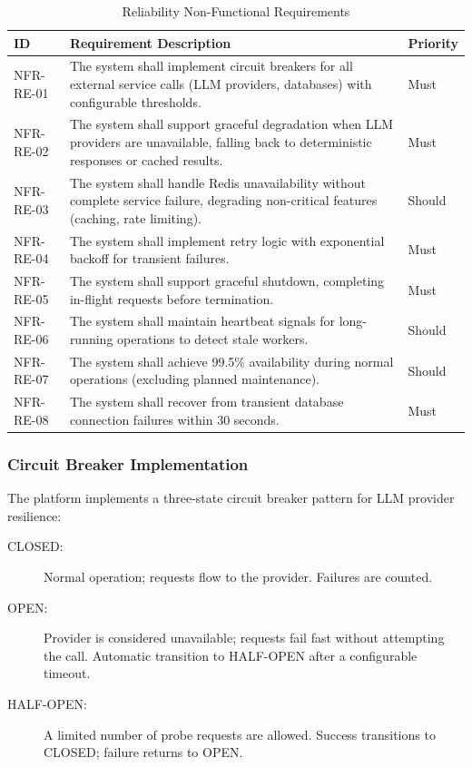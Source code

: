 \begin{table}[htbp]
\centering
\caption{Reliability Non-Functional Requirements}
\label{tab:nfr-reliability}
\small
\begin{tabularx}{\textwidth}{|l|X|l|}
\hline
\textbf{ID} & \textbf{Requirement Description} & \textbf{Priority} \\
\hline
NFR-RE-01 & The system shall implement circuit breakers for all external service calls (LLM providers, databases) with configurable thresholds. & Must \\
\hline
NFR-RE-02 & The system shall support graceful degradation when LLM providers are unavailable, falling back to deterministic responses or cached results. & Must \\
\hline
NFR-RE-03 & The system shall handle Redis unavailability without complete service failure, degrading non-critical features (caching, rate limiting). & Should \\
\hline
NFR-RE-04 & The system shall implement retry logic with exponential backoff for transient failures. & Must \\
\hline
NFR-RE-05 & The system shall support graceful shutdown, completing in-flight requests before termination. & Must \\
\hline
NFR-RE-06 & The system shall maintain heartbeat signals for long-running operations to detect stale workers. & Should \\
\hline
NFR-RE-07 & The system shall achieve 99.5\% availability during normal operations (excluding planned maintenance). & Should \\
\hline
NFR-RE-08 & The system shall recover from transient database connection failures within 30 seconds. & Must \\
\hline
\end{tabularx}
\end{table}

\subsubsection{Circuit Breaker Implementation}

The platform implements a three-state circuit breaker pattern for LLM provider resilience:

\begin{description}
    \item[CLOSED:] Normal operation; requests flow to the provider. Failures are counted.
    \item[OPEN:] Provider is considered unavailable; requests fail fast without attempting the call. Automatic transition to HALF-OPEN after a configurable timeout.
    \item[HALF-OPEN:] A limited number of probe requests are allowed. Success transitions to CLOSED; failure returns to OPEN.
\end{description}

